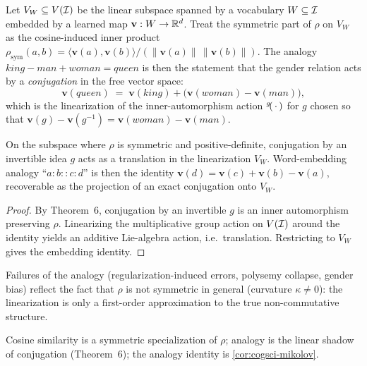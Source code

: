 \formalclaim Let $V_W\subseteq V(\mathcal{I})$ be the linear subspace spanned
by a vocabulary $W\subseteq\mathcal{I}$ embedded by a learned map
$\mathbf{v}:W\to\mathbb{R}^d$. Treat the symmetric part of $\rho$ on $V_W$ as
the cosine-induced inner product
$\rho_{\mathrm{sym}}(a,b)=\langle\mathbf{v}(a),\mathbf{v}(b)\rangle/
(\|\mathbf{v}(a)\|\,\|\mathbf{v}(b)\|)$. The analogy
$\mathit{king}-\mathit{man}+\mathit{woman}=\mathit{queen}$ is then the
statement that the gender relation acts by a \emph{conjugation} in the
free vector space:
\[
  \mathbf{v}(\mathit{queen})\;=\;\mathbf{v}(\mathit{king})+
  \bigl(\mathbf{v}(\mathit{woman})-\mathbf{v}(\mathit{man})\bigr),
\]
which is the linearization of the inner-automorphism action
${}^{g}\!(\,\cdot\,)$ for $g$ chosen so that
$\mathbf{v}(g)-\mathbf{v}(g^{-1})=\mathbf{v}(\mathit{woman})-\mathbf{v}(\mathit{man})$.

\begin{corollary}\label{cor:cogsci-mikolov}
On the subspace where $\rho$ is symmetric and positive-definite,
conjugation by an invertible idea $g$ acts as a translation in the
linearization $V_W$. Word-embedding analogy ``$a:b::c:d$'' is then the
identity $\mathbf{v}(d)=\mathbf{v}(c)+\mathbf{v}(b)-\mathbf{v}(a)$,
recoverable as the projection of an exact conjugation onto $V_W$.
\end{corollary}

\begin{proof}
By Theorem~6, conjugation by an invertible $g$ is an inner automorphism
preserving $\rho$. Linearizing the multiplicative group action on
$V(\mathcal{I})$ around the identity yields an additive Lie-algebra action,
i.e.\ translation. Restricting to $V_W$ gives the embedding identity.
\qedhere
\end{proof}

Failures of the analogy (regularization-induced errors, polysemy
collapse, gender bias) reflect the fact that $\rho$ is not symmetric in
general (curvature $\kappa\ne 0$): the linearization is only a first-order
approximation to the true non-commutative structure.

\formalstatus Cosine similarity is a symmetric specialization of $\rho$;
analogy is the linear shadow of conjugation (Theorem~6); the analogy
identity is \cref{cor:cogsci-mikolov}.

